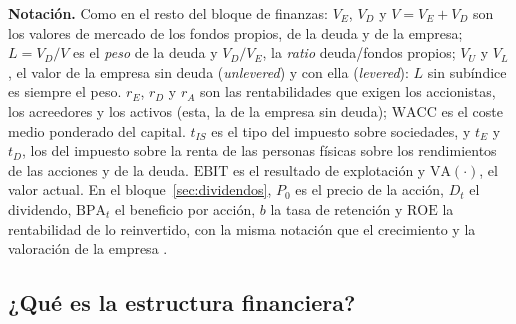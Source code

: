 \documentclass[11pt]{article}
\begin{document}
\begin{anotaciones}
\textbf{Notación.} Como en el resto del bloque de finanzas: $V_E$, $V_D$ y $V=V_E+V_D$ son los valores de mercado de los fondos propios, de la deuda y de la empresa; $L=V_D/V$ es el \emph{peso} de la deuda y $V_D/V_E$, la \emph{ratio} deuda/fondos propios; $V_U$ y $V_L$, el valor de la empresa sin deuda (\emph{unlevered}) y con ella (\emph{levered}): $L$ sin subíndice es siempre el peso. $r_E$, $r_D$ y $r_A$ son las rentabilidades que exigen los accionistas, los acreedores y los activos (esta, la de la empresa sin deuda); $\mathrm{WACC}$ es el coste medio ponderado del capital. $t_{IS}$ es el tipo del impuesto sobre sociedades, y $t_E$ y $t_D$, los del impuesto sobre la renta de las personas físicas sobre los rendimientos de las acciones y de la deuda. $\mathrm{EBIT}$ es el resultado de explotación y $\mathrm{VA}(\cdot)$, el valor actual. En el bloque~\ref{sec:dividendos}, $P_0$ es el precio de la acción, $D_t$ el dividendo, $\mathrm{BPA}_t$ el beneficio por acción, $b$ la tasa de retención y $\mathrm{ROE}$ la rentabilidad de lo reinvertido, con la misma notación que el crecimiento y la valoración de la empresa .
\end{anotaciones}

\subsection{¿Qué es la estructura financiera?}\label{sec:que-es}
\end{document}
